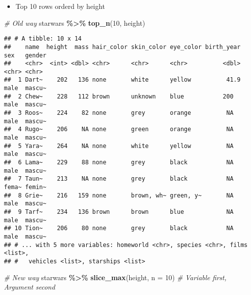 \documentclass[
]{book}
\newenvironment{Shaded}{\begin{snugshade}}{\end{snugshade}}
\newcommand{\CommentTok}[1]{\textcolor[rgb]{0.56,0.35,0.01}{\textit{#1}}}
\newcommand{\DataTypeTok}[1]{\textcolor[rgb]{0.13,0.29,0.53}{#1}}
\newcommand{\DecValTok}[1]{\textcolor[rgb]{0.00,0.00,0.81}{#1}}
\newcommand{\KeywordTok}[1]{\textcolor[rgb]{0.13,0.29,0.53}{\textbf{#1}}}
\newcommand{\NormalTok}[1]{#1}
\newcommand{\OperatorTok}[1]{\textcolor[rgb]{0.81,0.36,0.00}{\textbf{#1}}}
\newcommand{\StringTok}[1]{\textcolor[rgb]{0.31,0.60,0.02}{#1}}
\providecommand{\tightlist}{%
  \setlength{\itemsep}{0pt}\setlength{\parskip}{0pt}}
\begin{document}
\begin{itemize}
\tightlist
\item
  Top 10 rows orderd by height
\end{itemize}

\begin{Shaded}
\begin{Highlighting}[]
\CommentTok{\# Old way}
\NormalTok{starwars }\OperatorTok{\%\textgreater{}\%}
\StringTok{  }\KeywordTok{top\_n}\NormalTok{(}\DecValTok{10}\NormalTok{, height)}
\end{Highlighting}
\end{Shaded}

\begin{verbatim}
## # A tibble: 10 x 14
##    name  height  mass hair_color skin_color eye_color birth_year sex   gender
##    <chr>  <int> <dbl> <chr>      <chr>      <chr>          <dbl> <chr> <chr> 
##  1 Dart~    202   136 none       white      yellow          41.9 male  mascu~
##  2 Chew~    228   112 brown      unknown    blue           200   male  mascu~
##  3 Roos~    224    82 none       grey       orange          NA   male  mascu~
##  4 Rugo~    206    NA none       green      orange          NA   male  mascu~
##  5 Yara~    264    NA none       white      yellow          NA   male  mascu~
##  6 Lama~    229    88 none       grey       black           NA   male  mascu~
##  7 Taun~    213    NA none       grey       black           NA   fema~ femin~
##  8 Grie~    216   159 none       brown, wh~ green, y~       NA   male  mascu~
##  9 Tarf~    234   136 brown      brown      blue            NA   male  mascu~
## 10 Tion~    206    80 none       grey       black           NA   male  mascu~
## # ... with 5 more variables: homeworld <chr>, species <chr>, films <list>,
## #   vehicles <list>, starships <list>
\end{verbatim}

\begin{Shaded}
\begin{Highlighting}[]
\CommentTok{\# New way}
\NormalTok{starwars }\OperatorTok{\%\textgreater{}\%}
\StringTok{  }\KeywordTok{slice\_max}\NormalTok{(height, }\DataTypeTok{n =} \DecValTok{10}\NormalTok{) }\CommentTok{\# Variable first, Argument second}
\end{Highlighting}
\end{Shaded}
\end{document}
